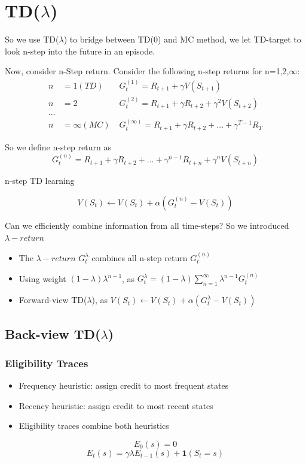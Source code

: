 \documentclass[12pt, a4paper]{paper}
\begin{document}
\section{TD($\lambda$)}

So we use TD($\lambda$) to bridge between TD(0) and MC method, we let TD-target to 
look n-step into the future in an episode.

Now, consider n-Step return. Consider the following n-step returns for n=1,2,$\infty$:
\begin{equation*}
	\begin{aligned}
		n &= 1 (TD) \;&G_{t}^{(1)} = R_{t+1} + \gamma V(S_{t+1}) \\
		n &= 2 \;&G_{t}^{(2)} = R_{t+1} + \gamma R_{t+2} + \gamma^2 V(S_{t+2}) \\
		...\\
		n &= \infty (MC) \; &G_{t}^{(\infty)} = R_{t+1} + \gamma R_{t+2} + ... + \gamma^{T-1}R_{T}
	\end{aligned}
\end{equation*}

 So we define n-step return as 
 $$ G_{t}^{(n)} = R_{t+1} + \gamma R_{t+2} + ... + \gamma^{n-1}R_{t+n} + \gamma^{n}V(S_{t+n}) $$
 
 n-step TD learning

$$ V(S_{t}) \leftarrow V(S_{t}) + \alpha(G_{t}^{(n)} - V(S_{t}))$$

Can we efficiently combine information from all time-steps? So we introduced $\lambda-return$

\begin{itemize}
	\item The $\lambda-return$ $G_{t}^{\lambda}$ combines all n-step return $G_{t}^{(n)}$
	\item Using weight $(1-\lambda)\lambda^{n-1}$, as $G_{t}^{\lambda} = (1-\lambda) \sum_{n=1}^{\infty} \lambda^{n-1}G_{t}^{(n)}$
	\item Forward-view TD($\lambda$), as  $V(S_{t}) \leftarrow V(S_{t}) + \alpha(G_{t}^{\lambda} - V(S_{t}))$
\end{itemize}

\subsection{Back-view TD($\lambda$)}
\subsubsection{Eligibility Traces}
\begin{itemize}
	\item Frequency heuristic: assign credit to most frequent states
	\item Recency heuristic: assign credit to most recent states
	\item Eligibility traces combine both heuristics
\end{itemize}
$$ E_{0}(s) = 0 $$
$$ E_{t}(s) = \gamma \lambda E_{t-1}(s) + \textbf{1}(S_{t} = s)$$
\end{document}
